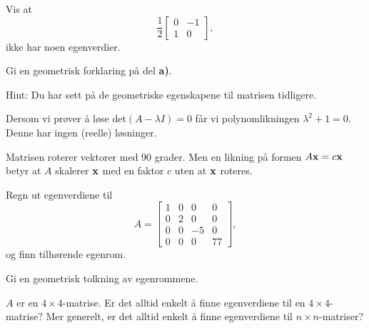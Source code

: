 \begin{oppgave}

\begin{punkt}
Vis at $$\frac{1}{2}\begin{bmatrix}
0 & -1\\
1 & 0
\end{bmatrix},
$$ ikke har noen egenverdier.

\end{punkt}

\begin{punkt}
Gi en geometrisk forklaring på del \textbf{a)}.

\noindent
Hint: Du har sett på de geometriske egenskapene til matrisen tidligere.
\end{punkt}

\end{oppgave}


\begin{losning}

\begin{punkt}
Dersom vi prøver å løse $\text{det}(A-\lambda I)=0$ får vi polynomlikningen $\lambda^2+1=0$. Denne har ingen (reelle) løsninger.
\end{punkt}

\begin{punkt}
Matrisen roterer vektorer med 90 grader. Men en likning på formen $A\mathbf{x}=c\mathbf{x}$ betyr at $A$ skalerer $\mathbf{x}$ med en faktor $c$ uten at $\mathbf{x}$ roteres.
\end{punkt}

\end{losning}


\begin{oppgave}
\begin{punkt}
Regn ut egenverdiene til $$A=\begin{bmatrix}
1 & 0 & 0 & 0\\
0 & 2 & 0 & 0\\
0 & 0 & -5 & 0\\
0 & 0 & 0 & 77
\end{bmatrix},
$$ og finn tilhørende egenrom.

\end{punkt}

\begin{punkt}
Gi en geometrisk tolkning av egenrommene.
\end{punkt}

\begin{punkt}
$A$ er en $4\times 4$-matrise. Er det alltid enkelt å finne egenverdiene til en $4\times 4$-matrise? Mer generelt, er det alltid enkelt å finne egenverdiene til $n\times n$-matriser?
\end{punkt}

\end{oppgave}


